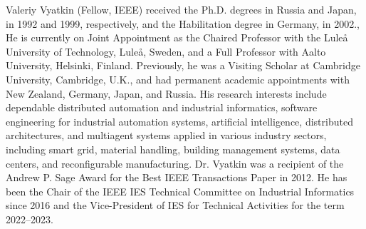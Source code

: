 \documentclass{ieeeojies}
\begin{document}
\begin{IEEEbiography}{Valeriy Vyatkin} (Fellow, IEEE) received the Ph.D. degrees in Russia and Japan, in 1992 and 1999, respectively, and the Habilitation degree in Germany, in 2002., He is currently on Joint Appointment as the Chaired Professor with the Luleå University of Technology, Luleå, Sweden, and a Full Professor with Aalto University, Helsinki, Finland. Previously, he was a Visiting Scholar at Cambridge University, Cambridge, U.K., and had permanent academic appointments with New Zealand, Germany, Japan, and Russia. His research interests include dependable distributed automation and industrial informatics, software engineering for industrial automation systems, artificial intelligence, distributed architectures, and multiagent systems applied in various industry sectors, including smart grid, material handling, building management systems, data centers, and reconfigurable manufacturing. Dr. Vyatkin was a recipient of the Andrew P. Sage Award for the Best IEEE Transactions Paper in 2012. He has been the Chair of the IEEE IES Technical Committee on Industrial Informatics since 2016 and the Vice-President of IES for Technical Activities for the term 2022–2023.
\end{IEEEbiography}

\EOD
\end{document}
